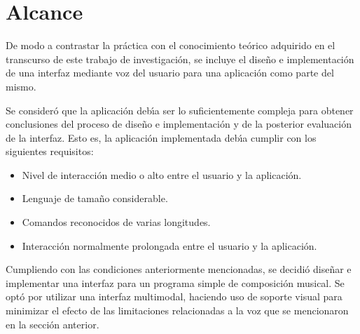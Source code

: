 \section{Alcance}
\label{sec:problema-especifico}

De modo a contrastar la pr\'actica con el conocimiento te\'orico adquirido en
el transcurso de este trabajo de investigaci\'on, se incluye el dise\~no e implementaci\'on de
una interfaz mediante voz del usuario para una aplicaci\'on como parte del mismo.

Se consider\'o que la aplicaci\'on deb{\'\i}a ser lo suficientemente compleja para obtener 
conclusiones del proceso de dise\~no e implementaci\'on y de la posterior evaluaci\'on
de la interfaz. Esto es, la aplicaci\'on implementada deb{\'\i}a cumplir con los siguientes requisitos:

\begin{itemize}
     \item Nivel de interacci\'on medio o alto entre el usuario y la aplicaci\'on.
     \item Lenguaje de tama\~no considerable.
     \item Comandos reconocidos de varias longitudes.
     \item Interacci\'on normalmente prolongada entre el usuario y la aplicaci\'on.
 \end{itemize} 

Cumpliendo con las condiciones anteriormente mencionadas, se decidi\'o dise\~nar e implementar 
una interfaz para un programa simple de composici\'on musical.
Se opt\'o por utilizar una interfaz multimodal, 
haciendo uso de soporte visual para minimizar el efecto de las limitaciones
relacionadas a la voz que se mencionaron en la secci\'on anterior.

